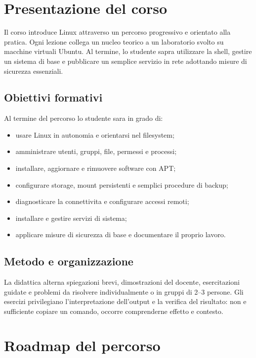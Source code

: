 \documentclass[11pt,a4paper]{article}
\begin{document}
\section{Presentazione del corso}

Il corso introduce Linux attraverso un percorso progressivo e orientato alla
pratica. Ogni lezione collega un nucleo teorico a un laboratorio svolto su
macchine virtuali Ubuntu. Al termine, lo studente sapra utilizzare la shell,
gestire un sistema di base e pubblicare un semplice servizio in rete adottando
misure di sicurezza essenziali.

\subsection{Obiettivi formativi}

Al termine del percorso lo studente sara in grado di:
\begin{itemize}
  \item usare Linux in autonomia e orientarsi nel filesystem;
  \item amministrare utenti, gruppi, file, permessi e processi;
  \item installare, aggiornare e rimuovere software con APT;
  \item configurare storage, mount persistenti e semplici procedure di backup;
  \item diagnosticare la connettivita e configurare accessi remoti;
  \item installare e gestire servizi di sistema;
  \item applicare misure di sicurezza di base e documentare il proprio lavoro.
\end{itemize}

\subsection{Metodo e organizzazione}

La didattica alterna spiegazioni brevi, dimostrazioni del docente, esercitazioni
guidate e problemi da risolvere individualmente o in gruppi di 2--3 persone.
Gli esercizi privilegiano l'interpretazione dell'output e la verifica del
risultato: non e sufficiente copiare un comando, occorre comprenderne effetto e
contesto.

\section{Roadmap del percorso}
\end{document}
